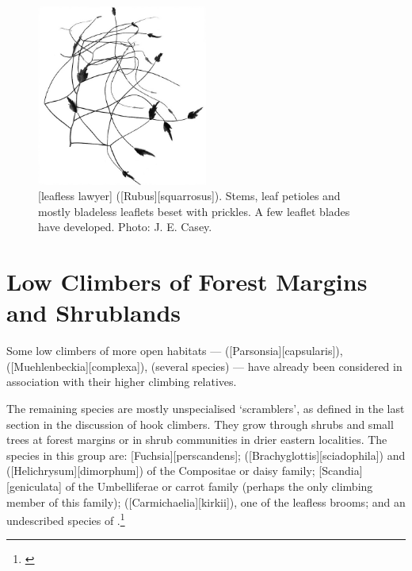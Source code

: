 \begin{figure}
	\includegraphics[width=0.5\textwidth]{graphics/fig_037}
	\centering
	\caption[Leafless lawyer, \emph{Rubus squarrosus}]{[leafless lawyer] ([Rubus][squarrosus]).
	Stems, leaf petioles and mostly bladeless leaflets beset with prickles.
	A few leaflet blades have developed.
	Photo: J. E. Casey.}%
	\label{fig:37rubus}
\end{figure}

\section{Low Climbers of Forest Margins and Shrublands}

Some low climbers of more open habitats ---  ([Parsonsia][capsularis]),  ([Muehlenbeckia][complexa]),  (several species) --- have already been considered in association with their higher climbing relatives.

The remaining species are mostly unspecialised `scramblers', as defined in the last section in the discussion of hook climbers.
They grow through shrubs and small trees at forest margins or in shrub communities in drier eastern localities.
The species in this group are: [Fuchsia][perscandens];  ([Brachyglottis][sciadophila]) and  ([Helichrysum][dimorphum]) of the Compositae or daisy family; [Scandia][geniculata] of the Umbelliferae or carrot family (perhaps the only climbing member of this family);  ([Carmichaelia][kirkii]), one of the leafless brooms; and an undescribed species of .\footnote{\cite{eagle1982trees}}

